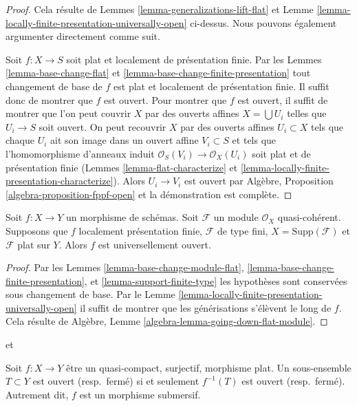 \begin{proof}
Cela résulte de Lemmes \ref{lemma-generalizations-lift-flat} et Lemme \ref{lemma-locally-finite-presentation-universally-open}
ci-dessus. Nous pouvons également argumenter
directement comme suit.

\medskip\noindent
Soit $f : X \to S$ soit plat et localement de présentation finie.
Par les Lemmes \ref{lemma-base-change-flat} et \ref{lemma-base-change-finite-presentation}
tout changement de base de $f$ est plat et localement de présentation
finie. Il suffit donc de montrer que $f$ est ouvert. Pour
montrer que $f$ est ouvert, il suffit de montrer
que l'on peut couvrir $X$ par des ouverts affines
$X = \bigcup U_i$ telles que $U_i \to S$ soit ouvert. On peut recouvrir $X$
par des ouverts affines $U_i \subset X$ tels que chaque
$U_i$ ait son image dans un ouvert affine $V_i \subset S$ et tels
que l'homomorphisme d'anneaux induit $\mathcal{O}_S(V_i) \to \mathcal{O}_X(U_i)$ soit plat et de présentation
finie (Lemmes \ref{lemma-flat-characterize} et \ref{lemma-locally-finite-presentation-characterize}).
Alors $U_i \to V_i$ est ouvert
par Algèbre, Proposition \ref{algebra-proposition-fppf-open} et la démonstration
est complète.
\end{proof}

\begin{lemma}
\label{lemma-pf-flat-module-open}
Soit $f : X \to Y$ un morphisme de schémas. Soit
$\mathcal{F}$ un module $\mathcal{O}_X$ quasi-cohérent. Supposons
que $f$ localement présentation finie, $\mathcal{F}$
de type fini, $X = \text{Supp}(\mathcal{F})$ et $\mathcal{F}$ plat sur
$Y$. Alors $f$ est universellement ouvert.
\end{lemma}

\begin{proof}
Par les Lemmes \ref{lemma-base-change-module-flat}, \ref{lemma-base-change-finite-presentation},
et \ref{lemma-support-finite-type} les hypothèses
sont conservées sous
changement de base. Par le Lemme
\ref{lemma-locally-finite-presentation-universally-open} il suffit de montrer que les générisations
s'élèvent le long de $f$.
Cela résulte de Algèbre, Lemme \ref{algebra-lemma-going-down-flat-module}.
\end{proof}

\begin{lemma}
\label{lemma-fpqc-quotient-topology}
\begin{reference}
\cite[Expose VIII, Corollaire 4.3]{SGA1} et \cite[IV,
Corollaire 2.3.12]{EGA}
\end{reference}
Soit $f : X \to Y$ être un quasi-compact, surjectif, morphisme plat. Un sous-ensemble
$T \subset Y$ est ouvert (resp.\ fermé) si et seulement $f^{-1}(T)$
est ouvert (resp.\ fermé). Autrement dit, $f$ est
un morphisme submersif.
\end{lemma}

